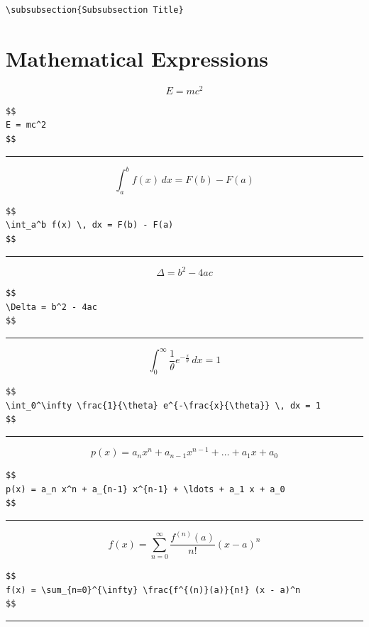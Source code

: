 \documentclass[12pt]{article}
\begin{document}
\begin{verbatim}
\subsubsection{Subsubsection Title}
\end{verbatim}



\section{Mathematical Expressions}


$$
E = mc^2
$$

\begin{verbatim}
$$
E = mc^2
$$
\end{verbatim}


\hrule

$$
\int_a^b f(x) \, dx = F(b) - F(a)
$$

\begin{verbatim}
$$
\int_a^b f(x) \, dx = F(b) - F(a)
$$
\end{verbatim}

\hrule

$$
\Delta = b^2 - 4ac
$$

\begin{verbatim}
$$
\Delta = b^2 - 4ac
$$
\end{verbatim}

\hrule

$$
\int_0^\infty \frac{1}{\theta} e^{-\frac{x}{\theta}} \, dx = 1
$$

\begin{verbatim}
$$
\int_0^\infty \frac{1}{\theta} e^{-\frac{x}{\theta}} \, dx = 1
$$
\end{verbatim}

\hrule

$$
p(x) = a_n x^n + a_{n-1} x^{n-1} + \ldots + a_1 x + a_0
$$

\begin{verbatim}
$$
p(x) = a_n x^n + a_{n-1} x^{n-1} + \ldots + a_1 x + a_0
$$
\end{verbatim}

\hrule

$$
f(x) = \sum_{n=0}^{\infty} \frac{f^{(n)}(a)}{n!} (x - a)^n
$$

\begin{verbatim}
$$
f(x) = \sum_{n=0}^{\infty} \frac{f^{(n)}(a)}{n!} (x - a)^n
$$
\end{verbatim}

\hrule
\end{document}
